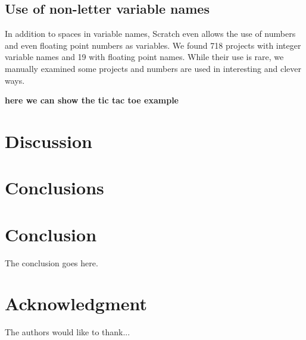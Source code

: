\documentclass[conference]{IEEEtran}
\newcommand{\todo}[1]{ \textbf{#1} }
\begin{document}
\subsection{Use of non-letter variable names}
In addition to spaces in variable names, Scratch even allows the use of numbers and even floating point numbers as variables. We found 718 projects with integer variable names and 19 with floating point names. While their use is rare, we manually examined some projects and numbers are used in interesting and clever ways.

\todo{here we can show the tic tac toe example}

 \section{Discussion}
 \section{Conclusions}

\section{Conclusion}
The conclusion goes here.






\section*{Acknowledgment}


The authors would like to thank...









%

\end{document}
